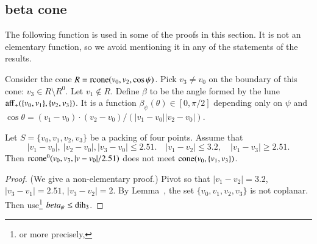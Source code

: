 \begin{tarskidata}
\subsection{beta cone}
The following function is used in some of the proofs in this
section.  It is not an elementary function, so we avoid mentioning
it in any of the statements of the results.  
\begin{tarski}

\begin{definition}[$\beta$]
Consider the cone $R={\operatorname{rcone}}(v_0,v_2,\cos\psi)$.  Pick
$v_3\ne v_0$ on the boundary of this cone: $v_3\in R\setminus R^0$.
Let $v_1\not\in R$.  
Define $\beta$ to be the angle formed by the lune
   ${\operatorname{aff}}_+(\{v_0,v_1\},\{v_2,v_3\})$. It is a function
$\beta_\psi(\theta)\in[0,\pi/2]$ depending only on $\psi$ and
$\cos\theta = (v_1-v_0)\cdot (v_2-v_0)/(|v_1-v_0||v_2-v_0|)$.
\end{definition}
\end{tarski}





\begin{tarski}

\begin{lemma}
 Let $S=\{v_0,v_1,v_2,v_3\}$ be a packing of four points.
Assume
that 
  $$
    |v_1-v_0|,\ |v_2-v_0|, |v_3-v_0|\le 2.51.\quad 
    |v_1-v_2|\le 3.2,\quad |v_1-v_3|\ge 2.51.
   $$
Then ${\operatorname{rcone}}^0(v_0,v_3,|v-v_0|/2.51)$ does not meet
${\operatorname{cone}}(v_0,\{v_1,v_3\})$.
\end{lemma}


\begin{proof} (We give a non-elementary proof.)
Pivot so that $|v_1-v_2|=3.2$, $|v_3-v_1|=2.51$, $|v_3-v_2|=2$. 
By Lemma~, the
set $\{v_0,v_1,v_2,v_3\}$ is not coplanar. 
Then use\footnote{ or more precisely,  } %
 $beta_\psi\le \operatorname{dih}_3$.
\end{proof}
\end{tarski}






\end{tarskidata}
